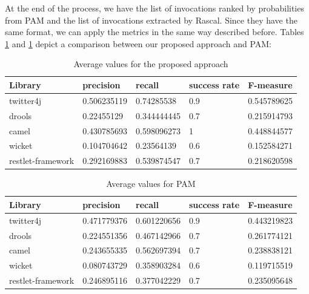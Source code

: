 At the end of the process, we have the list of invocations ranked by probabilities from PAM and the list of invocations extracted by Rascal. Since they have the same format, we can apply the metrics in the same way described before. Tables \ref{tab:AverageValue}  and \ref{tab:AverageValue} depict a comparison between our proposed approach and PAM: 

\begin{table}[!h]

\begin{tabular}{|p{3.5cm}|p{2.0cm}|p{2.0cm}|p{2.5cm}|p{2.0cm}|}\hline
	 \textbf{Library} & \textbf{precision}  & \textbf{recall} & \textbf{success rate} & \textbf{F-measure} \\\hline
	 twitter4j &  0.506235119 & 0.74285538 &  0.9 & 0.545789625 \\\hline
	drools & 0.22455129 &   0.344444445 & 0.7 & 0.215914793\\\hline
	camel & 0.430785693  & 0.598096273 & 1 & 0.448844577 \\\hline 
	wicket & 0.104704642 & 0.23564139 & 0.6 & 0.152584271 \\\hline
	restlet-framework &  0.292169883 &  0.539874547 & 0.7 & 0.218620598  \\\hline
\end{tabular}
\caption{ Average values for the proposed approach }\label{tab:AverageValue}
\end{table} 
 
 
 \begin{table}[!h]
	\begin{tabular}{|p{3.5cm}|p{2.0cm}|p{2.0cm}|p{2.5cm}|p{2.0cm}|}\hline
	 \textbf{Library} & \textbf{precision}  & \textbf{recall} & \textbf{success rate} & \textbf{F-measure} \\ \hline
	 twitter4j & 0.471779376  & 0.601220656 & 0.9  & 0.443219823  \\ \hline
	 drools & 0.224551356 & 0.467142966   & 0.7 & 0.261774121 \\ \hline
	 camel & 0.243655335  & 0.562697394 & 0.7 & 0.238838121 \\ \hline 
	 wicket &0.080743729  & 0.358903284 &  0.6 & 0.119715519  \\ \hline
	 restlet-framework & 0.246895116  & 0.377042229 & 0.7 & 0.235095648 \\ \hline
	\end{tabular}
	 \caption{ Average values for PAM}\label{tab:AverageValuePAM}
\end{table} 


